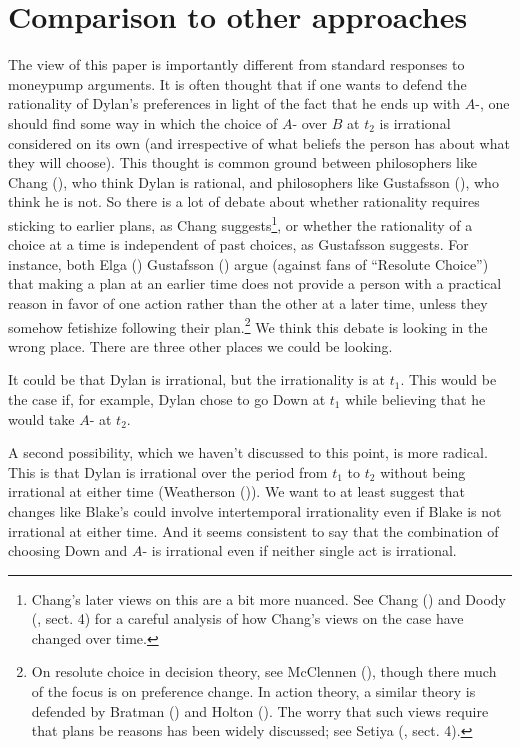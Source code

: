 \documentclass[
  11pt,
  letterpaper,
  DIV=11,
  numbers=noendperiod,
  twoside]{scrartcl}
\begin{document}
\section{Comparison to other
approaches}\label{comparison-to-other-approaches}

The view of this paper is importantly different from standard responses
to moneypump arguments. It is often thought that if one wants to defend
the rationality of Dylan's preferences in light of the fact that he ends
up with \(A\)-, one should find some way in which the choice of \(A\)-
over \(B\) at \(t_2\) is irrational considered on its own (and
irrespective of what beliefs the person has about what they will
choose). This thought is common ground between philosophers like Chang
(), who think Dylan is rational, and
philosophers like Gustafsson (), who
think he is not. So there is a lot of debate about whether rationality
requires sticking to earlier plans, as Chang suggests\footnote{Chang's
  later views on this are a bit more nuanced. See Chang
  () and Doody
  (, sect. 4) for a careful analysis of
  how Chang's views on the case have changed over time.}, or whether the
rationality of a choice at a time is independent of past choices, as
Gustafsson suggests. For instance, both Elga
() Gustafsson
() argue (against fans of
``Resolute Choice'') that making a plan at an earlier time does not
provide a person with a practical reason in favor of one action rather
than the other at a later time, unless they somehow fetishize following
their plan.\footnote{On resolute choice in decision theory, see
  McClennen (), though there much of
  the focus is on preference change. In action theory, a similar theory
  is defended by Bratman () and Holton
  (). The worry that such views require
  that plans be reasons has been widely discussed; see Setiya
  (, sect. 4).} We think this debate
is looking in the wrong place. There are three other places we could be
looking.

It could be that Dylan is irrational, but the irrationality is at
\(t_1\). This would be the case if, for example, Dylan chose to go Down
at \(t_1\) while believing that he would take \(A\)- at \(t_2\).

A second possibility, which we haven't discussed to this point, is more
radical. This is that Dylan is irrational over the period from \(t_1\)
to \(t_2\) without being irrational at either time (Weatherson
()). We want to at least
suggest that changes like Blake's could involve intertemporal
irrationality even if Blake is not irrational at either time. And it
seems consistent to say that the combination of choosing Down and \(A\)-
is irrational even if neither single act is irrational.
\end{document}
